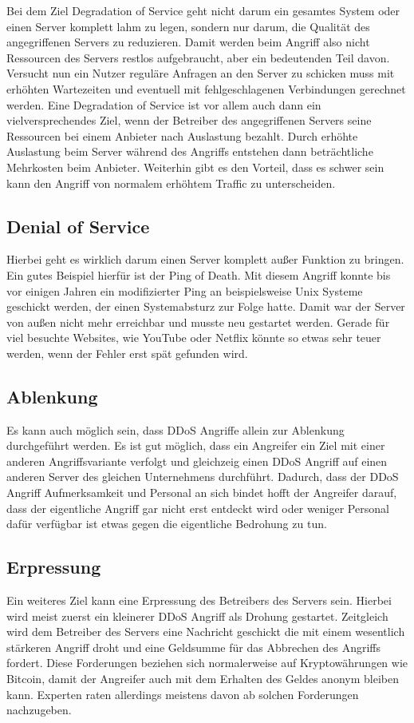 Bei dem Ziel Degradation of Service geht nicht darum ein gesamtes System oder einen Server komplett lahm zu legen, sondern nur darum, die Qualität des angegriffenen Servers zu reduzieren. Damit werden beim Angriff also nicht Ressourcen des Servers restlos aufgebraucht, aber ein bedeutenden Teil davon. Versucht nun ein Nutzer reguläre Anfragen an den Server zu schicken muss mit erhöhten Wartezeiten und eventuell mit fehlgeschlagenen Verbindungen gerechnet werden. Eine Degradation of Service ist vor allem auch dann ein vielversprechendes Ziel, wenn der Betreiber des angegriffenen Servers seine Ressourcen bei einem Anbieter nach Auslastung bezahlt. Durch erhöhte Auslastung beim Server während des Angriffs entstehen dann beträchtliche Mehrkosten beim Anbieter. Weiterhin gibt es den Vorteil, dass es schwer sein kann den Angriff von normalem erhöhtem Traffic zu unterscheiden.

\subsection{Denial of Service}

Hierbei geht es wirklich darum einen Server komplett außer Funktion zu bringen. Ein gutes Beispiel hierfür ist der Ping of Death. Mit diesem Angriff konnte bis vor einigen Jahren ein modifizierter Ping an beispielsweise Unix Systeme geschickt werden, der einen Systemabsturz zur Folge hatte. Damit war der Server von außen nicht mehr erreichbar und musste neu gestartet werden. Gerade für viel besuchte Websites, wie YouTube oder Netflix könnte so etwas sehr teuer werden, wenn der Fehler erst spät gefunden wird.

\subsection{Ablenkung}

Es kann auch möglich sein, dass DDoS Angriffe allein zur Ablenkung durchgeführt werden. Es ist gut möglich, dass ein Angreifer ein Ziel mit einer anderen Angriffsvariante verfolgt und gleichzeig einen DDoS Angriff auf einen anderen Server des gleichen Unternehmens durchführt. Dadurch, dass der DDoS Angriff Aufmerksamkeit und Personal an sich bindet hofft der Angreifer darauf, dass der eigentliche Angriff gar nicht erst entdeckt wird oder weniger Personal dafür verfügbar ist etwas gegen die eigentliche Bedrohung zu tun.

\subsection{Erpressung}

Ein weiteres Ziel kann eine Erpressung des Betreibers des Servers sein. Hierbei wird meist zuerst ein kleinerer DDoS Angriff als Drohung gestartet. Zeitgleich wird dem Betreiber des Servers eine Nachricht geschickt die mit einem wesentlich stärkeren Angriff droht und eine Geldsumme für das Abbrechen des Angriffs fordert. Diese Forderungen beziehen sich normalerweise auf Kryptowährungen wie Bitcoin, damit der Angreifer auch mit dem Erhalten des Geldes anonym bleiben kann. Experten raten allerdings meistens davon ab solchen Forderungen nachzugeben.
